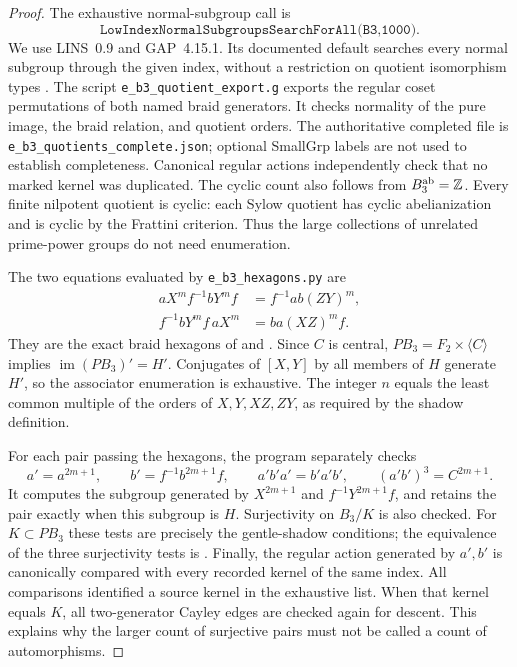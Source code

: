 \begin{proof}
The exhaustive normal-subgroup call is
\[
 \texttt{LowIndexNormalSubgroupsSearchForAll(B3,1000)}.
\]
We use LINS~0.9 and GAP~4.15.1. Its documented default searches every
normal subgroup through the given index, without a restriction
on quotient isomorphism types \citep[\S2.3.2]{Rober2024LINS}.
The script \texttt{e\_b3\_quotient\_export.g} exports the regular
coset permutations of both named braid generators. It checks
normality of the pure image, the braid relation, and quotient
orders. The authoritative completed file is
\texttt{e\_b3\_quotients\_complete.json}; optional SmallGrp labels
are not used to establish completeness. Canonical regular actions
independently check that no marked kernel was duplicated.
The cyclic count also follows from $B_3^{\rm ab}=\mathbb Z$.
Every finite nilpotent quotient is cyclic: each Sylow quotient has
cyclic abelianization and is cyclic by the Frattini criterion.
Thus the large collections of unrelated prime-power groups do
not need enumeration.

The two equations evaluated by \texttt{e\_b3\_hexagons.py} are
\begin{align*}
 aX^m f^{-1}bY^m f&=f^{-1}ab(ZY)^m,\\
 f^{-1}bY^m f\,aX^m&=ba(XZ)^m f.
\end{align*}
They are the exact braid hexagons of
\citet[(2.18)--(2.19)]{DolgushevLeLorenz2024} and
\citet[(3.3)--(3.4)]{DolgushevGuynee2024}.
Since $C$ is central, $PB_3=F_2\times\langle C\rangle$ implies
$\operatorname{im}(PB_3)'=H'$. Conjugates of $[X,Y]$ by all
members of $H$ generate $H'$, so the associator enumeration is
exhaustive. The integer $n$ equals the least common multiple
of the orders of $X,Y,XZ,ZY$, as required by the shadow definition.

For each pair passing the hexagons, the program separately checks
\[
 a'=a^{2m+1},\qquad b'=f^{-1}b^{2m+1}f,
 \qquad a'b'a'=b'a'b',\qquad(a'b')^3=C^{2m+1}.
\]
It computes the subgroup generated by $X^{2m+1}$ and
$f^{-1}Y^{2m+1}f$, and retains the pair exactly when this subgroup
is $H$. Surjectivity on $B_3/K$ is also checked.
For $K\subset PB_3$ these tests are precisely the gentle-shadow
conditions; the equivalence of the three surjectivity tests is
\citet[Propositions~3.2, 3.5 and 3.6]{DolgushevGuynee2024}.
Finally, the regular action generated by $a',b'$ is canonically
compared with every recorded kernel of the same index.
All comparisons identified a source kernel in the exhaustive list.
When that kernel equals $K$, all two-generator Cayley edges are
checked again for descent. This explains why the larger count of
surjective pairs must not be called a count of automorphisms.
\end{proof}

